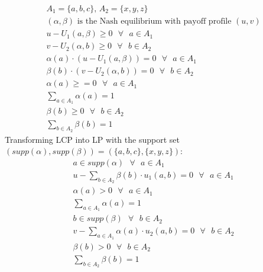 \documentclass[a4paper,
  twoside, %
  headlines=2.1 %
  ]{scrartcl}
\begin{document}
\begin{align}
    A_1 = \lbrace a,b,c \rbrace \text{, } A_2 = \lbrace x, y, z \rbrace\\
    (\alpha, \beta) \text{ is the Nash equilibrium with payoff profile }(u,v)\\
    u- U_1(a,\beta) \geq 0 \text{ } \forall \text{ } a \in A_1\\
    v- U_2(\alpha, b) \geq 0 \text{ } \forall \text{ } b \in A_2\\
    \alpha(a) \cdot (u- U_1 (a, \beta)) = 0 \text{ } \forall \text{ } a \in A_1\\
    \beta(b) \cdot (v - U_2(\alpha, b)) =0 \text{ } \forall \text{ }b \in A_2\\
    \alpha(a) \geq =0 \text{ } \forall \text{ } a \in A_1\\
    \sum_{a\in A_1} \alpha(a) =1\\
    \beta(b) \geq 0 \text{ } \forall \text{ }b \in A_2\\
    \sum_{b \in A_2} \beta(b) =1
\end{align}
Transforming LCP into LP with the support set $(supp(\alpha), supp(\beta)) = (\lbrace a,b,c\rbrace,\lbrace x,y,z \rbrace)$:\\
\begin{align}
    a \in supp(\alpha) \text{ } \forall \text{ } a \in A_1\\
    u - \sum_{b \in A_2} \beta(b) \cdot u_1(a,b) = 0 \text{ } \forall \text{ } a \in A_1\\
    \alpha(a) > 0 \text{ } \forall \text{ } a \in A_1\\
    \sum_{a \in A_1} \alpha(a) = 1\\
    b \in supp(\beta) \text{ } \forall \text{ } b \in A_2\\
    v- \sum_{a \in A_1} \alpha(a) \cdot u_2(a,b) =0 \text{ } \forall \text{ } b \in A_2\\
    \beta(b) > 0 \text{ } \forall \text{ } b \in A_2\\
    \sum_{b\in A_2} \beta(b) =1
\end{align}
\end{document}
